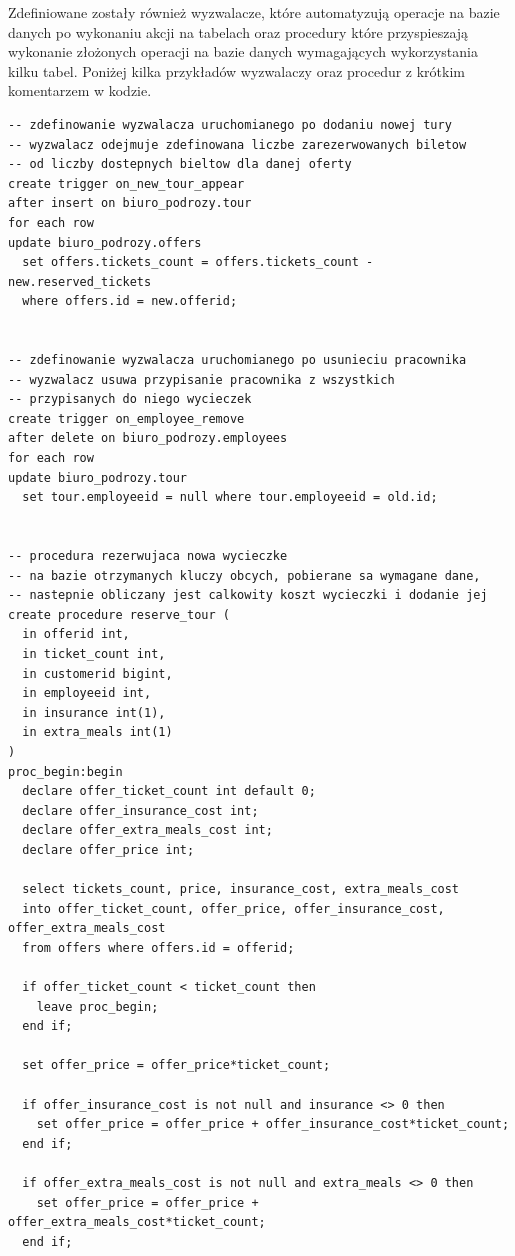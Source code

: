 \documentclass[polish,polish,a4paper]{article}
\begin{document}
Zdefiniowane zostały również wyzwalacze, które automatyzują operacje na bazie danych po wykonaniu akcji na tabelach oraz procedury które przyspieszają wykonanie złożonych operacji na bazie danych wymagających wykorzystania kilku tabel.\newline
Poniżej kilka przykładów wyzwalaczy oraz procedur z krótkim komentarzem w kodzie.\newline
\begin{lstlisting}
-- zdefinowanie wyzwalacza uruchomianego po dodaniu nowej tury
-- wyzwalacz odejmuje zdefinowana liczbe zarezerwowanych biletow
-- od liczby dostepnych bieltow dla danej oferty
create trigger on_new_tour_appear
after insert on biuro_podrozy.tour
for each row
update biuro_podrozy.offers
  set offers.tickets_count = offers.tickets_count - new.reserved_tickets
  where offers.id = new.offerid;


-- zdefinowanie wyzwalacza uruchomianego po usunieciu pracownika
-- wyzwalacz usuwa przypisanie pracownika z wszystkich
-- przypisanych do niego wycieczek
create trigger on_employee_remove
after delete on biuro_podrozy.employees
for each row
update biuro_podrozy.tour
  set tour.employeeid = null where tour.employeeid = old.id;


-- procedura rezerwujaca nowa wycieczke
-- na bazie otrzymanych kluczy obcych, pobierane sa wymagane dane,
-- nastepnie obliczany jest calkowity koszt wycieczki i dodanie jej
create procedure reserve_tour (
  in offerid int,
  in ticket_count int,
  in customerid bigint,
  in employeeid int,
  in insurance int(1),
  in extra_meals int(1)
)
proc_begin:begin
  declare offer_ticket_count int default 0;
  declare offer_insurance_cost int;
  declare offer_extra_meals_cost int;
  declare offer_price int;

  select tickets_count, price, insurance_cost, extra_meals_cost
  into offer_ticket_count, offer_price, offer_insurance_cost, offer_extra_meals_cost
  from offers where offers.id = offerid;

  if offer_ticket_count < ticket_count then
    leave proc_begin;
  end if;

  set offer_price = offer_price*ticket_count;

  if offer_insurance_cost is not null and insurance <> 0 then
    set offer_price = offer_price + offer_insurance_cost*ticket_count;
  end if;

  if offer_extra_meals_cost is not null and extra_meals <> 0 then
    set offer_price = offer_price + offer_extra_meals_cost*ticket_count;
  end if;


\end{lstlisting}
\end{document}
